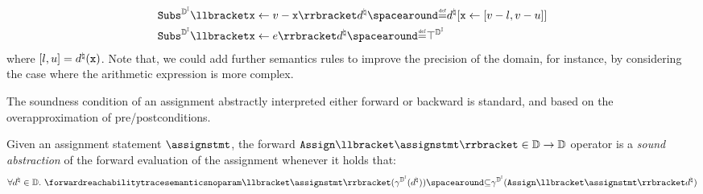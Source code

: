 \begin{description}
\begin{align*}
    &\intervalabstractdomainsubstitute \substitutionof{\defvariable}{\defvalue - \defvariable}\defabstractvalue \DefeQ \updatemem{\defabstractvalue}{\defvariable}{\interval{\defvalue-l}{\defvalue-u}} \\
    &\intervalabstractdomainsubstitute \substitutionof{\defvariable}{\defaexp} \defabstractvalue \DefeQ \intervalabstractdomaintop
  \end{align*}
  where $[l, u] = d^\natural(\textup{\texttt{x}})$.
  Note that, we could add further semantics rules to improve the precision of the domain, for instance, by considering the case where the arithmetic expression is more complex.

  The soundness condition of an assignment abstractly interpreted either forward or backward is standard, and based on the overapproximation of pre/postconditions.
  \begin{definition}
    Given an assignment statement $\assignstmt$, the forward $\abstractdomainassign \semanticsof{\assignstmt}\in \abstractdomain \to \abstractdomain$ operator is a \emph{sound abstraction} of the forward evaluation of the assignment whenever it holds that:
  \begin{align*}
    \forall \defabstractvalue\in\abstractdomain.\spacer \forwardreachabilitytracesemanticsnoparam\semanticsof{\assignstmt}( \intervalabstractdomainconcretization(\defabstractvalue)) \SubseteQ \intervalabstractdomainconcretization(\abstractdomainassign \semanticsof{\assignstmt}\defabstractvalue)
  \end{align*}
\end{definition}
\end{description}
